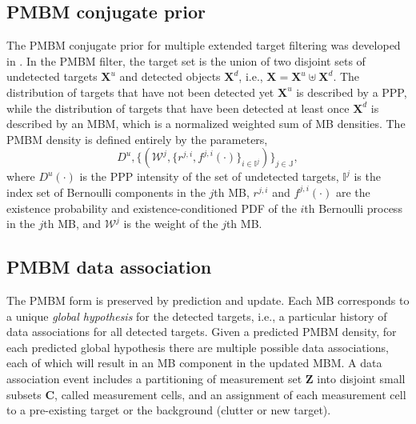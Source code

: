 \documentclass[conference]{IEEEtran}
\begin{document}
\subsection{PMBM conjugate prior}
The PMBM conjugate prior for multiple extended target filtering was developed in \cite{pmbmextended,pmbmextended2}. In the PMBM filter, the target set is the union of two disjoint sets of undetected targets $\mathbf{X}^u$ and detected objects $\mathbf{X}^d$, i.e., $\mathbf{X} = \mathbf{X}^u\uplus\mathbf{X}^d$. The distribution of targets that have not been detected yet $\mathbf{X}^u$ is described by a PPP, while the distribution of targets that have been detected at least once $\mathbf{X}^d$ is described by an MBM, which is a normalized weighted sum of MB densities. The PMBM density is defined entirely by the parameters,
\begin{equation}
D^u, \{(\mathcal{W}^j,\{r^{j,i},f^{j,i}(\cdot)\}_{i\in\mathbb{I}^j})\}_{j\in\mathbb{J}},
\label{eq:update}
\end{equation}
where $D^u(\cdot)$ is the PPP intensity of the set of undetected targets, $\mathbb{I}^j$ is the index set of Bernoulli components in the $j$th MB, $r^{j,i}$ and $f^{j,i}(\cdot)$ are the existence probability and existence-conditioned PDF of the $i$th Bernoulli process in the $j$th MB, and $\mathcal{W}^j$ is the weight of the $j$th MB.


\subsection{PMBM data association}
The PMBM form is preserved by prediction and update. Each MB corresponds to a unique \textit{global hypothesis} for the detected targets, i.e., a particular history of data associations for all detected targets. Given a predicted PMBM density, for each predicted global hypothesis there are multiple possible data associations, each of which will result in an MB component in the updated MBM. A data association event includes a partitioning of measurement set $\mathbf{Z}$ into disjoint small subsets $\mathbf{C}$, called measurement cells, and an assignment of each measurement cell to a pre-existing target or the background (clutter or new target). 
\end{document}
